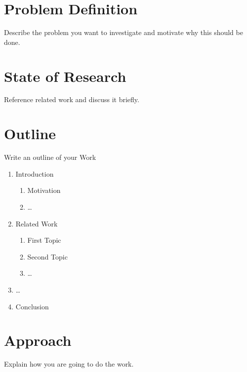 \section{Problem Definition}
  Describe the problem you want to investigate and motivate why this should be done.

\section{State of Research}
  Reference related work and discuss it briefly.

\section{Outline}
  Write an outline of your Work
  \begin{enumerate}
    \item Introduction
    \begin{enumerate}
     \item Motivation
     \item \ldots
    \end{enumerate}
    \item Related Work
    \begin{enumerate}
     \item First Topic
     \item Second Topic
     \item \ldots
    \end{enumerate}
    \item \ldots
    \item Conclusion
  \end{enumerate}


\section{Approach}
  Explain how you are going to do the work.